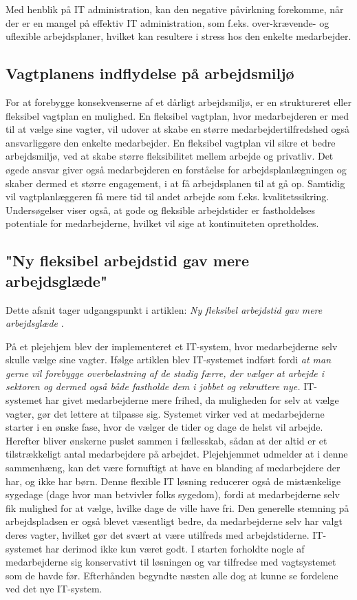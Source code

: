 Med henblik på IT administration, kan den negative påvirkning forekomme, når der er en mangel på effektiv IT administration, som f.eks. over-krævende- og uflexible arbejdsplaner, hvilket kan resultere i stress hos den enkelte medarbejder\citep{Cambridge2011}.

\subsection{Vagtplanens indflydelse på arbejdsmiljø}
For at forebygge konsekvenserne af et dårligt arbejdsmiljø, er en struktureret eller fleksibel vagtplan en mulighed. En fleksibel vagtplan, hvor medarbejderen er med til at vælge sine vagter, vil udover at skabe en større medarbejdertilfredshed også ansvarliggøre den enkelte medarbejder. En fleksibel vagtplan vil sikre et bedre arbejdsmiljø, ved at skabe større fleksibilitet mellem arbejde og privatliv. Det øgede ansvar giver også medarbejderen en forståelse for arbejdsplanlægningen og skaber dermed et større engagement, i at få arbejdsplanen til at gå op. Samtidig vil vagtplanlæggeren få mere tid til andet arbejde som f.eks. kvalitetssikring.
Undersøgelser viser også, at gode og fleksible arbejdstider er fastholdelses potentiale for medarbejderne, hvilket vil sige at kontinuiteten opretholdes. \\
    
\subsection{"Ny fleksibel arbejdstid gav mere arbejdsglæde"}
\noindent Dette afsnit tager udgangspunkt i artiklen: \textit{Ny fleksibel arbejdstid gav mere arbejdsglæde} \citep{Thomse2014}.

På et plejehjem blev der implementeret et IT-system, hvor medarbejderne selv skulle vælge sine vagter. Ifølge artiklen blev IT-systemet indført fordi \textit{ at man gerne vil forebygge overbelastning af de stadig færre, der vælger at arbejde i sektoren og dermed også både fastholde dem i jobbet og rekruttere nye.} IT-systemet har givet medarbejderne mere frihed, da muligheden for selv at vælge vagter, gør det lettere at tilpasse sig. Systemet virker ved at medarbejderne starter i en ønske fase, hvor de vælger de tider og dage de helst vil arbejde. Herefter bliver ønskerne puslet sammen i fællesskab, sådan at der altid er et tilstrækkeligt antal medarbejdere på arbejdet. Plejehjemmet udmelder at i denne sammenhæng, kan det være fornuftigt at have en blanding af medarbejdere der har, og ikke har børn. Denne flexible IT løsning reducerer også de mistænkelige sygedage (dage hvor man betvivler folks sygedom), fordi at medarbejderne selv fik mulighed for at vælge, hvilke dage de ville have fri. Den generelle stemning på arbejdspladsen er også blevet væsentligt bedre, da medarbejderne selv har valgt deres vagter, hvilket gør det svært at være utilfreds med arbejdstiderne. IT-systemet har derimod ikke kun været godt. I starten forholdte nogle af medarbejderne sig konservativt til løsningen og var tilfredse med vagtsystemet som de havde før. Efterhånden begyndte næsten alle dog at kunne se fordelene ved det nye IT-system. 

